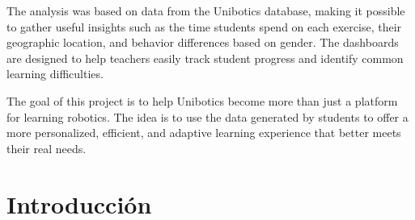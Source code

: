 \documentclass[a4paper, 12pt]{book}
\begin{document}
The analysis was based on data from the Unibotics database, making it possible to gather useful insights such as the time students spend on each exercise, their geographic location, and behavior differences based on gender. The dashboards are designed to help teachers easily track student progress and identify common learning difficulties.

The goal of this project is to help Unibotics become more than just a platform for learning robotics. The idea is to use the data generated by students to offer a more personalized, efficient, and adaptive learning experience that better meets their real needs.





\tableofcontents 
\cleardoublepage
\listoffigures %
\cleardoublepage
\listoflistings


\cleardoublepage
\chapter{Introducción}
\label{sec:intro}
\end{document}

